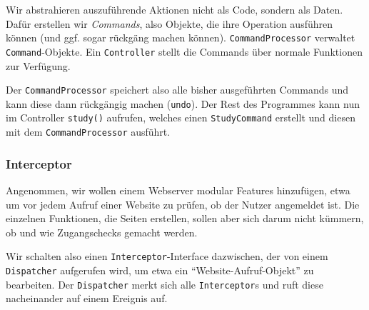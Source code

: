 \documentclass{panikzettel}
\begin{document}
Wir abstrahieren auszuführende Aktionen nicht als Code, sondern als Daten.
Dafür erstellen wir \emph{Commands}, also Objekte, die ihre Operation ausführen können (und ggf. sogar rückgäng machen können).
\lstinline{CommandProcessor} verwaltet \lstinline{Command}-Objekte.
Ein \lstinline{Controller} stellt die Commands über normale Funktionen zur Verfügung.


Der \lstinline{CommandProcessor} speichert also alle bisher ausgeführten Commands und kann diese dann rückgängig machen (\lstinline{undo}).
Der Rest des Programmes kann nun im Controller \lstinline{study()} aufrufen, welches einen \lstinline{StudyCommand} erstellt und diesen mit dem \lstinline{CommandProcessor} ausführt.

\subsubsection{Interceptor}

Angenommen, wir wollen einem Webserver modular Features hinzufügen, etwa um vor jedem Aufruf einer Website zu prüfen, ob der Nutzer angemeldet ist.
Die einzelnen Funktionen, die Seiten erstellen, sollen aber sich darum nicht kümmern, ob und wie Zugangschecks gemacht werden.

Wir schalten also einen \lstinline{Interceptor}-Interface dazwischen, der von einem \lstinline{Dispatcher} aufgerufen wird, um etwa ein ``Website-Aufruf-Objekt'' zu bearbeiten.
Der \lstinline{Dispatcher} merkt sich alle \lstinline{Interceptor}s und ruft diese nacheinander auf einem Ereignis auf.

\end{document}
